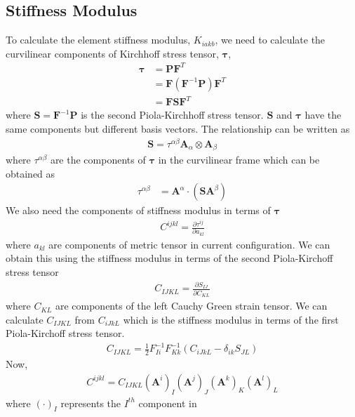 \documentclass[../main.tex]{subfiles}
\begin{document}
\subsection{Stiffness Modulus}
To calculate the element stiffness modulus, $K_{iakb}$, we need to
calculate the curvilinear components of Kirchhoff stress tensor,
$\bm{\tau}$,
\begin{align*}
  \bm{\tau} &= \mathbf{P}\mathbf{F}^T\\
            &= \mathbf{F}(\mathbf{F}^{-1}\mathbf{P})\mathbf{F}^{T}\\
            &= \mathbf{F}\mathbf{S}\mathbf{F}^{T}
\end{align*}
where $\mathbf{S}=\mathbf{F}^{-1}\mathbf{P}$ is the second
Piola-Kirchhoff stress tensor. $\mathbf{S}$ and $\bm{\tau}$ have the
same components but different basis vectors. The relationship can be
written as
\begin{align*}
  \mathbf{S} = \tau^{\alpha\beta}\mathbf{A}_{\alpha}\otimes\mathbf{A}_{\beta}
\end{align*}
where $\tau^{\alpha\beta}$ are the components of $\bm{\tau}$ in the
curvilinear frame which can be obtained as
\begin{align*}
  \tau^{\alpha\beta} &= \mathbf{A}^\alpha\cdot\left(\mathbf{S}\mathbf{A}^{\beta}\right)
\end{align*}
We also need the components of stiffness modulus in terms of
$\bm{\tau}$
\begin{align*}
  C^{ijkl} = \frac{\partial\tau^{ij}}{\partial a_{kl}}
\end{align*}
where $a_{kl}$ are components of metric tensor in current
configuration. We can obtain this using the stiffness modulus in terms
of the second Piola-Kirchoff stress tensor
\begin{align*}
  C_{IJKL} = \frac{\partial S_{IJ}}{\partial C_{KL}}
\end{align*}
where $C_{KL}$ are components of the left Cauchy Green strain
tensor. We can calculate $C_{IJKL}$ from $C_{iJkL}$ which is the
stiffness modulus in terms of the first Piola-Kirchoff stress tensor.
\begin{align*}
  C_{IJKL} = \frac{1}{2}F^{-1}_{Ii}F^{-1}_{Kk}\left(C_{iJkL}-\delta_{ik}S_{JL}\right)
\end{align*}
Now,
\begin{align*}
  C^{ijkl} = C_{IJKL}(\mathbf{A}^i)_I(\mathbf{A}^j)_J(\mathbf{A}^k)_K(\mathbf{A}^l)_L
\end{align*}
where $\left(\cdot\right)_I$ represents the $I^{th}$ component in
\end{document}
